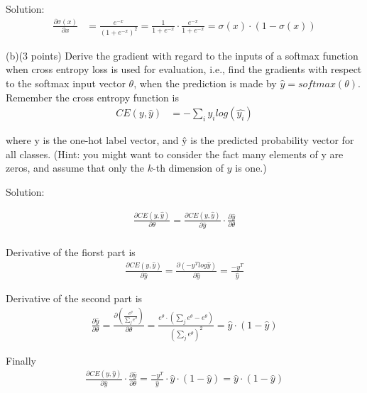 \documentclass[12pt]{article}
\begin{document}
Solution:
\begin{align*}
\frac{\partial \sigma (x)}{\partial x} &= \frac{e^{-x}}{(1 + e^{-x})^2}
= \frac{1}{1 + e^{-x}} \cdot \frac{e^{-x}}{1 + e^{-x}} = \sigma(x) \cdot (1 - \sigma(x))
\end{align*}

(b)(3 points) Derive the gradient with regard to the inputs of a softmax function when cross entropy loss
is used for evaluation, i.e., find the gradients with respect to the softmax input vector $\theta$, when the
prediction is made by $\hat{y} = softmax(\theta)$. Remember the cross entropy function is
\begin{align*}
CE(y, \hat{y}) &= - \sum_{i} y_i log (\hat{y_i})
\end{align*}

where y is the one-hot label vector, and \^{y} is the predicted probability vector for all classes. (Hint: you
might want to consider the fact many elements of y are zeros, and assume that only the $k$-th dimension
of $y$ is one.)

Solution:

\begin{align*}
\frac{\partial CE(y, \hat{y})}{\partial \theta}
= \frac{\partial CE(y, \hat{y})}{\partial \hat{y}} \cdot \frac{\partial \hat{y}}{\partial \theta} \\
\end{align*}

Derivative of the fiorst part is
\begin{align*}
\frac{\partial CE(y, \hat{y})}{\partial \hat{y}}
= \frac{\partial (- y^T log \hat{y})}{\partial \hat{y}}
= \frac{-y^T}{\hat{y}}
\end{align*}

Derivative of the second part is
\begin{align*}
\frac{\partial \hat{y}}{\partial \theta}
= \frac{\partial (\frac{e^{\theta}}{\sum_j e^{\theta}})}{\partial \theta}
= \frac{e^{\theta} \cdot (\sum_j e^{\theta} - e^{\theta})}{(\sum_j e^{\theta})^2}
= \hat{y} \cdot (1 - \hat{y})
\end{align*}

Finally
\begin{align*}
\frac{\partial CE(y, \hat{y})}{\partial \hat{y}} \cdot \frac{\partial \hat{y}}{\partial \theta}
= \frac{-y^T}{\hat{y}} \cdot \hat{y} \cdot (1 - \hat{y})
= \hat{y} \cdot (1 - \hat{y})
\end{align*}
\end{document}
